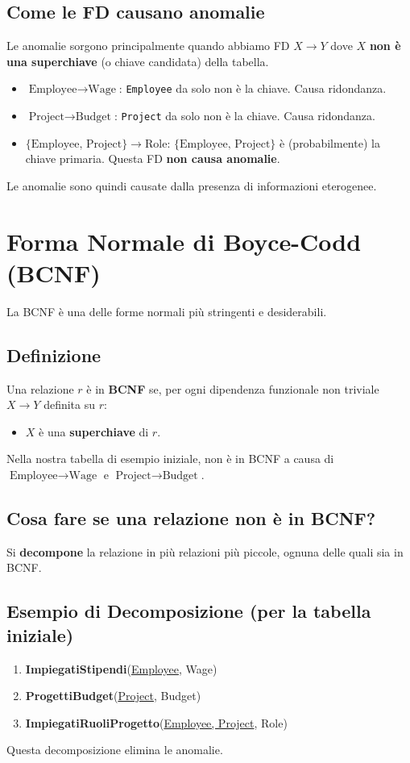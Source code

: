 \documentclass{article}
\begin{document}
	\subsection{Come le FD causano anomalie}
	Le anomalie sorgono principalmente quando abbiamo FD $X \rightarrow Y$ dove $X$ \textbf{non è una superchiave} (o chiave candidata) della tabella.
	\begin{itemize}
		\item $\text{Employee} \rightarrow \text{Wage}$: \texttt{Employee} da solo non è la chiave. Causa ridondanza.
		\item $\text{Project} \rightarrow \text{Budget}$: \texttt{Project} da solo non è la chiave. Causa ridondanza.
		\item $\{\text{Employee, Project}\} \rightarrow \text{Role}$: $\{\text{Employee, Project}\}$ è (probabilmente) la chiave primaria. Questa FD \textbf{non causa anomalie}.
	\end{itemize}
	Le anomalie sono quindi causate dalla presenza di informazioni eterogenee.
	
	\section{Forma Normale di Boyce-Codd (BCNF)}
	La BCNF è una delle forme normali più stringenti e desiderabili.
	
	\subsection{Definizione}
	Una relazione $r$ è in \textbf{BCNF} se, per ogni dipendenza funzionale non triviale $X \rightarrow Y$ definita su $r$:
	\begin{itemize}
		\item $X$ è una \textbf{superchiave} di $r$.
	\end{itemize}
	
	Nella nostra tabella di esempio iniziale, non è in BCNF a causa di $\text{Employee} \rightarrow \text{Wage}$ e $\text{Project} \rightarrow \text{Budget}$.
	
	\subsection{Cosa fare se una relazione non è in BCNF?}
	Si \textbf{decompone} la relazione in più relazioni più piccole, ognuna delle quali sia in BCNF.
	
	\subsection{Esempio di Decomposizione (per la tabella iniziale)}
	\begin{enumerate}
		\item \textbf{ImpiegatiStipendi}(\underline{Employee}, Wage)
		\item \textbf{ProgettiBudget}(\underline{Project}, Budget)
		\item \textbf{ImpiegatiRuoliProgetto}(\underline{Employee, Project}, Role)
	\end{enumerate}
	Questa decomposizione elimina le anomalie.
	
\end{document}
